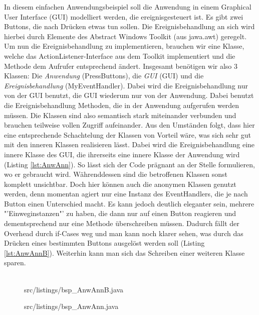 In diesem einfachen Anwendungsbeispiel soll die Anwendung in einem Graphical User Interface (GUI) modelliert werden, die ereignisgesteuert ist.
Es gibt zwei Buttons, die nach Drücken etwas tun sollen.
Die Ereignisbehandlung an sich wird hierbei durch Elemente des Abstract Windows Toolkit (aus jawa.awt) geregelt.
Um nun die Ereignisbehandlung zu implementieren, brauchen wir eine Klasse, welche das ActionListener-Interface aus dem Toolkit implementiert und die Methode dem Aufrufer entsprechend ändert.
Insgesamt benötigen wir also 3 Klassen: Die {\it Anwendung} (PressButtons), die {\it GUI} (GUI) und die {\it Ereignisbehandlung} (MyEventHandler). Dabei wird die Ereignisbehandlung nur von der GUI benutzt, die GUI wiederum nur von der Anwendung. Dabei benutzt die Ereignisbehandlung Methoden, die in der Anwendung aufgerufen werden müssen.
Die Klassen sind also semantisch stark miteinander verbunden und brauchen teilweise vollen Zugriff aufeinander.
Aus den Umständen folgt, dass hier eine entsprechende Schachtelung der Klassen von Vorteil wäre, was sich sehr gut mit den inneren Klassen realisieren lässt.
Dabei wird die Ereignisbehandlung eine innere Klasse des GUI, die ihrerseits eine innere Klasse der Anwendung wird (Listing \ref{lst:AnwAnn}).
So lässt sich der Code prägnant an der Stelle formulieren, wo er gebraucht wird.
Währenddessen sind die betroffenen Klassen sonst komplett unsichtbar.
Doch hier können auch die anonymen Klassen genutzt werden, denn momentan agiert nur eine Instanz des EventHandlers, die je nach Button einen Unterschied macht. Es kann jedoch deutlich eleganter sein, mehrere "'Einweginstanzen"' zu haben, die dann nur auf einen Button reagieren und dementsprechend nur eine Methode überschreiben müssen.
Dadurch fällt der Overhead durch if-Cases weg und man kann noch klarer sehen, was durch das Drücken eines bestimmten Buttons ausgelöst werden soll (Listing \ref{lst:AnwAnnB}). Weiterhin kann man sich das Schreiben einer weiteren Klasse sparen.
\\
\\

\begin{figure}[H]
\lstset{language=Java}
 {src/listings/bsp_AnwAnnB.java}
\end{figure}
\newpage

\begin{figure}[H]
\lstset{language=Java}
 {src/listings/bsp_AnwAnn.java}
\end{figure}
\newpage

